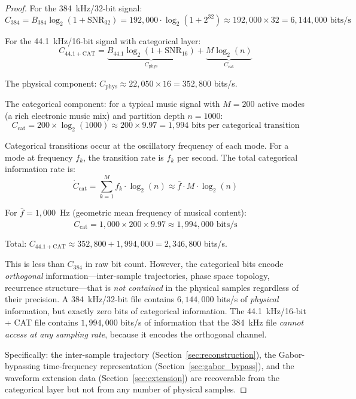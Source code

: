 \documentclass[twocolumn,10pt]{article}
\theoremstyle{remark}
\newcommand{\Ccat}{C_{\mathrm{cat}}}
\newcommand{\Cphys}{C_{\mathrm{phys}}}
\begin{document}
\begin{proof}
For the 384~kHz/32-bit signal:
\begin{equation}
    C_{384} = B_{384} \log_2(1 + \mathrm{SNR}_{32}) = 192{,}000 \cdot \log_2(1 + 2^{32}) \approx 192{,}000 \times 32 = 6{,}144{,}000 \text{ bits/s}
\end{equation}

For the 44.1~kHz/16-bit signal with categorical layer:
\begin{equation}
    C_{44.1+\mathrm{CAT}} = \underbrace{B_{44.1} \log_2(1 + \mathrm{SNR}_{16})}_{\Cphys} + \underbrace{M \log_2(n)}_{\Ccat}
\end{equation}

The physical component: $\Cphys \approx 22{,}050 \times 16 = 352{,}800$ bits/s.

The categorical component: for a typical music signal with $M = 200$ active modes (a rich electronic music mix) and partition depth $n = 1000$:
\begin{equation}
    \Ccat = 200 \times \log_2(1000) \approx 200 \times 9.97 = 1{,}994 \text{ bits per categorical transition}
\end{equation}

Categorical transitions occur at the oscillatory frequency of each mode. For a mode at frequency $f_k$, the transition rate is $f_k$ per second. The total categorical information rate is:
\begin{equation}
    \dot{C}_{\mathrm{cat}} = \sum_{k=1}^{M} f_k \cdot \log_2(n) \approx \bar{f} \cdot M \cdot \log_2(n)
\end{equation}

For $\bar{f} = 1{,}000$~Hz (geometric mean frequency of musical content):
\begin{equation}
    \dot{C}_{\mathrm{cat}} = 1{,}000 \times 200 \times 9.97 \approx 1{,}994{,}000 \text{ bits/s}
\end{equation}

Total: $C_{44.1+\mathrm{CAT}} \approx 352{,}800 + 1{,}994{,}000 = 2{,}346{,}800$ bits/s.

This is less than $C_{384}$ in raw bit count. However, the categorical bits encode \textit{orthogonal} information---inter-sample trajectories, phase space topology, recurrence structure---that is \textit{not contained} in the physical samples regardless of their precision. A 384~kHz/32-bit file contains $6{,}144{,}000$ bits/s of \textit{physical} information, but exactly zero bits of categorical information. The 44.1~kHz/16-bit + CAT file contains $1{,}994{,}000$ bits/s of information that the 384~kHz file \textit{cannot access at any sampling rate}, because it encodes the orthogonal channel.

Specifically: the inter-sample trajectory (Section~\ref{sec:reconstruction}), the Gabor-bypassing time-frequency representation (Section~\ref{sec:gabor_bypass}), and the waveform extension data (Section~\ref{sec:extension}) are recoverable from the categorical layer but not from any number of physical samples.
\end{proof}
\end{document}
